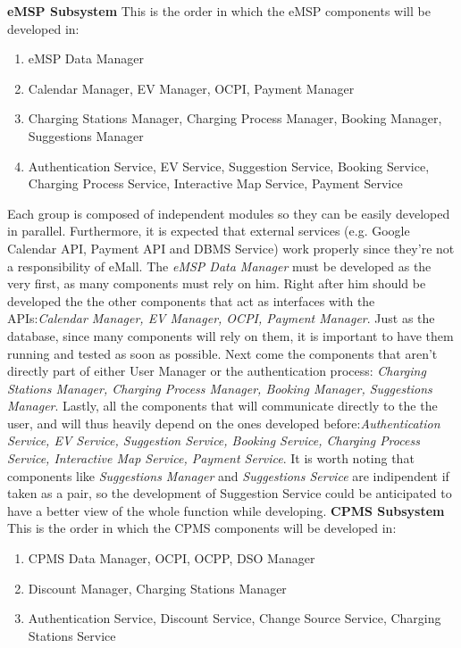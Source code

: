 \documentclass[table, 12pt]{article}
\begin{document}
\textbf{eMSP Subsystem}\newline
This is the order in which the eMSP components will be developed in:
\begin{enumerate}
    \item eMSP Data Manager 
    \item Calendar Manager, EV Manager, OCPI, Payment Manager
    \item Charging Stations Manager, Charging Process Manager, Booking Manager, Suggestions Manager
    \item Authentication Service, EV Service, Suggestion Service, Booking Service, Charging Process Service, Interactive Map Service, Payment Service
\end{enumerate}
Each group is composed of independent modules so they can be easily developed in parallel.
Furthermore, it is expected that external services (e.g. Google Calendar API, Payment API and DBMS Service) work properly since they're not a responsibility of eMall.
The \emph{eMSP Data Manager} must be developed as the very first, as many components must rely on him. Right after him should be developed the the other components that act
as interfaces with the APIs:\emph{Calendar Manager, EV Manager, OCPI, Payment Manager}. Just as the database, since many components will rely on them, it is important to have them running and tested as soon as possible.
Next come the components that aren't directly part of either User Manager or the authentication process: \emph{Charging Stations Manager, Charging Process Manager, Booking Manager, Suggestions Manager}. Lastly, all the components that will communicate directly to the 
the user, and will thus heavily depend on the ones developed before:\emph{Authentication Service, EV Service, Suggestion Service, Booking Service, Charging Process Service, Interactive Map Service, Payment Service}.
It is worth noting that components like \emph{Suggestions Manager} and \emph{Suggestions Service} are indipendent if taken as a pair, so the development of Suggestion Service could be anticipated to have a better view of the whole function while developing.
\newpage
\textbf{CPMS Subsystem}\newline
This is the order in which the CPMS components will be developed in:
\begin{enumerate}
    \item CPMS Data Manager, OCPI, OCPP, DSO Manager
    \item Discount Manager, Charging Stations Manager
    \item Authentication Service, Discount Service, Change Source Service, Charging Stations Service
\end{enumerate}
\end{document}
